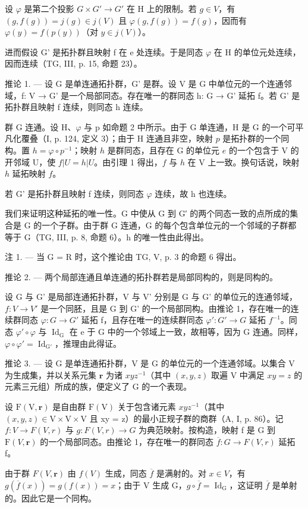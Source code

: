 设 \(\varphi\) 是第二个投影 \(G \times G' \to G'\) 在 H 上的限制。若 \(g \in V\)，有 \((g, f(g)) = j(g) \in j(V)\) 且 \(\varphi(g, f(g)) = f(g)\)，因而有 \(\varphi(y) = f(p(y))\)（对 \(y \in j(V)\)）。

进而假设 G' 是拓扑群且映射 f 在 e 处连续。于是同态 \(\varphi\) 在 H 的单位元处连续，因而连续（TG, III, p. 15, 命题 23）。

推论 1. --- 设 G 是单连通拓扑群，G' 是群。设 V 是 G 中单位元的一个连通邻域，f: V → G' 是一个局部同态。存在唯一的群同态 h: G → G' 延拓 f。若 G' 是拓扑群且映射 f 连续，则同态 h 连续。

群 G 连通。设 H、\(\varphi\) 与 p 如命题 2 中所示。由于 G 单连通，H 是 G 的一个可平凡化覆叠（I, p. 124, 定义 3）；由于 H 连通且非空，映射 \(p\) 是拓扑群的一个同构。置 \(h = \varphi \circ p^{-1}\)；映射 \(h\) 是群同态，且存在 G 的单位元 \(e\) 的一个包含于 V 的开邻域 U，使 \(f|U = h|U\)。由引理 1 得出，\(f\) 与 \(h\) 在 V 上一致。换句话说，映射 \(h\) 延拓映射 \(f\)。

若 G' 是拓扑群且映射 f 连续，则同态 \(\varphi\) 连续，故 h 也连续。

我们来证明这种延拓的唯一性。G 中使从 G 到 G′ 的两个同态一致的点所成的集合是 G 的一个子群。由于群 G 连通，G 的每个包含单位元的一个邻域的子群都等于 G（TG, III, p. 8, 命题 6）。h 的唯一性由此得出。

注 1. --- 当 G = R 时，这个推论由 TG, V, p. 3 的命题 6 得出。

推论 2. --- 两个局部连通且单连通的拓扑群若是局部同构的，则是同构的。

设 G 与 G' 是局部连通拓扑群，V 与 V' 分别是 G 与 G' 的单位元的连通邻域，\(f: V \to V'\) 是一个同胚，且是 G 到 G' 的一个局部同构。由推论 1，存在唯一的连续群同态 \(\varphi: G \to G'\) 延拓 f，且存在唯一的连续群同态 \(\varphi': G' \to G\) 延拓 \(f^{-1}\)。同态 \(\varphi' \circ \varphi\) 与 \(\operatorname{Id}_{\mathrm{G}}\) 在 e 于 G 中的一个邻域上一致，故相等，因为 G 连通。同样，\(\varphi \circ \varphi' = \operatorname{Id}_{\mathrm{G}'}\)，推理由此得证。

推论 3. --- 设 G 是单连通拓扑群，V 是 G 的单位元的一个连通邻域。以集合 V 为生成集，并以关系元集 \(\mathbf{r}\) 为诸 \(xyz^{-1}\)（其中 \((x,y,z)\) 取遍 V 中满足 \(xy = z\) 的元素三元组）所成的族，便定义了 G 的一个表现。

设 \(\mathrm{F}(\mathrm{V}, \mathbf{r})\) 是自由群 \(\mathrm{F}(\mathrm{V})\) 关于包含诸元素 \(xyz^{-1}\)（其中 \((x, y, z) \in \mathrm{V} \times \mathrm{V} \times \mathrm{V}\) 且 xy = z）的最小正规子群的商群（A, I, p. 86）。记 \(f: V \to F(V, r)\) 与 \(g: F(V, r) \to G\) 为典范映射。按构造，映射 f 是 G 到 \(\mathrm{F}(V, \mathbf{r})\) 的一个局部同态。由推论 1，存在唯一的群同态 \(\overline{f}: G \to F(V, r)\) 延拓 f。

由于群 \(F(V, \mathbf{r})\) 由 \(f(V)\) 生成，同态 \(\overline{f}\) 是满射的。对 \(x \in V\)，有 \(g(\overline{f}(x)) = g(f(x)) = x\)；由于 V 生成 G，\(g \circ \overline{f} = \operatorname{Id}_{\operatorname{G}}\)，这证明 \(\overline{f}\) 是单射的。因此它是一个同构。
\relax{}
